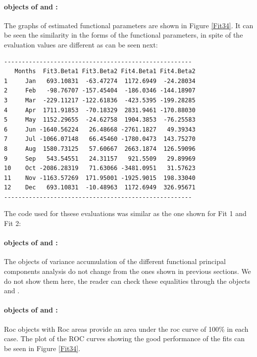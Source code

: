 \paragraph{ objects of  and :} The graphs of estimated functional parameters are shown in Figure \ref{Fit34}. It can be seen the similarity in the forms of the functional parameters, in spite of the evaluation values are different as can be seen next:
\begin{center}
\begin{verbatim}
-----------------------------------------------------
   Months  Fit3.Beta1 Fit3.Beta2 Fit4.Beta1 Fit4.Beta2 
1     Jan   693.10831  -63.47274  1172.6949  -24.28034
2     Feb   -98.76707 -157.45404  -186.0346 -144.18907
3     Mar  -229.11217 -122.61836  -423.5395 -199.28285
4     Apr  1711.91853  -70.18329  2831.9461 -170.88030
5     May  1152.29655  -24.62758  1904.3853  -76.25583
6     Jun -1640.56224   26.48668 -2761.1827   49.39343
7     Jul -1066.07148   66.45460 -1780.0473  143.75270
8     Aug  1580.73125   57.60667  2663.1874  126.59096
9     Sep   543.54551   24.31157   921.5509   29.89969
10    Oct -2086.28319   71.63066 -3481.0951   31.57623
11    Nov -1163.57269  171.95001 -1925.9015  198.33040
12    Dec   693.10831  -10.48963  1172.6949  326.95671
-----------------------------------------------------
\end{verbatim}
\end{center}
\noindent The code used for thsese evaluations was similar as the one shown for Fit 1 and Fit 2: 


\paragraph{ objects of  and :} The objects of variance accumulation of the different functional principal components analysis do not change from the ones shown in previous sections. We do not show them here, the reader can check these equalities through the objects  and . 

\paragraph{  objects of  and :} Roc objects with Roc areas provide an area under the roc curve of 100\% in each case. The plot of the ROC curves showing the good performance of the fits can be seen in Figure \ref{Fit34}.  


